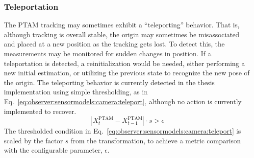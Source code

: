     \subsubsection{Teleportation}
        \label{sssec:observer:sensormodels:camera:teleportation}
        The PTAM tracking may sometimes exhibit a ``teleporting'' behavior.
        That is, although tracking is overall stable, the origin may
        sometimes be misassociated and placed at a new position as the
        tracking gets lost.
        To detect this, the measurements may be monitored for sudden changes in position.
        If a teleportation is detected, a reinitialization would be needed,
        either performing a new initial estimation, or utilizing the previous state
        to recognize the new pose of the origin.
        The teleporting behavior is currently detected in the thesis implementation using simple thresholding,
        as in Eq.~\eqref{eq:observer:sensormodels:camera:teleport},
        although no action is currently implemented to recover.
        \begin{equation}
            \label{eq:observer:sensormodels:camera:teleport}
            \left|X^{\text{PTAM}}_{t} - X^{\text{PTAM}}_{t-1}\right| \cdot s > \epsilon
        \end{equation}
        The thresholded condition in Eq.~\eqref{eq:observer:sensormodels:camera:teleport}
        is scaled by the factor $s$ from the transformation, to achieve a metric comparison
        with the configurable parameter, $\epsilon$.
